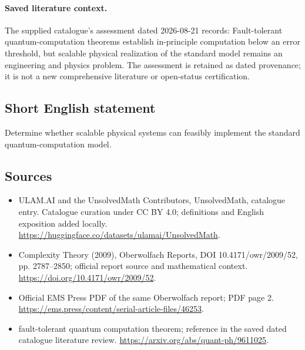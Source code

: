 \documentclass[11pt]{article}
\begin{document}
\paragraph{Saved literature context.} The supplied catalogue's assessment dated 2026-08-21 records: Fault-tolerant quantum-computation theorems establish in-principle computation below an error threshold, but scalable physical realization of the standard model remains an engineering and physics problem. The assessment is retained as dated provenance; it is not a new comprehensive literature or open-status certification.
\subsection{Short English statement}
Determine whether scalable physical systems can feasibly implement the standard quantum-computation model.
\subsection{Sources}
\begin{itemize}
\item[\hypertarget{source:statement:1}{S1}] ULAM.AI and the UnsolvedMath Contributors, UnsolvedMath, catalogue entry. Catalogue curation under CC BY 4.0; definitions and English exposition added locally.
\url{https://huggingface.co/datasets/ulamai/UnsolvedMath}.
\item[\hypertarget{source:statement:2}{S2}] Complexity Theory (2009), Oberwolfach Reports, DOI 10.4171/owr/2009/52, pp. 2787--2850; official report source and mathematical context.
\url{https://doi.org/10.4171/owr/2009/52}.
\item[\hypertarget{source:statement:3}{S3}] Official EMS Press PDF of the same Oberwolfach report; PDF page 2.
\url{https://ems.press/content/serial-article-files/46253}.
\item[\hypertarget{source:statement:4}{S4}] fault-tolerant quantum computation theorem; reference in the saved dated catalogue literature review.
\url{https://arxiv.org/abs/quant-ph/9611025}.
\end{itemize}
\label{end:statement}
\end{document}
